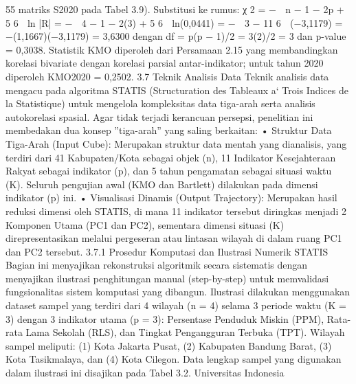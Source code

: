 55
matriks S2020 pada Tabel 3.9). Substitusi ke rumus:
χ
2 = −

n − 1 −
2p + 5
6

ln |R| = −

4 − 1 −
2(3) + 5
6

ln(0,0441)
= −

3 −
11
6

(−3,1179) = −(1,1667)(−3,1179) = 3,6300
dengan df = p(p − 1)/2 = 3(2)/2 = 3 dan p-value = 0,3038. Statistik KMO diperoleh
dari Persamaan 2.15 yang membandingkan korelasi bivariate dengan korelasi parsial
antar-indikator; untuk tahun 2020 diperoleh KMO2020 = 0,2502.
3.7 Teknik Analisis Data
Teknik analisis data mengacu pada algoritma STATIS (Structuration des Tableaux a`
Trois Indices de la Statistique) untuk mengelola kompleksitas data tiga-arah serta analisis
autokorelasi spasial. Agar tidak terjadi kerancuan persepsi, penelitian ini membedakan
dua konsep ”tiga-arah” yang saling berkaitan:
• Struktur Data Tiga-Arah (Input Cube): Merupakan struktur data mentah yang
dianalisis, yang terdiri dari 41 Kabupaten/Kota sebagai objek (n), 11 Indikator
Kesejahteraan Rakyat sebagai indikator (p), dan 5 tahun pengamatan sebagai situasi
waktu (K). Seluruh pengujian awal (KMO dan Bartlett) dilakukan pada dimensi
indikator (p) ini.
• Visualisasi Dinamis (Output Trajectory): Merupakan hasil reduksi dimensi oleh
STATIS, di mana 11 indikator tersebut diringkas menjadi 2 Komponen Utama (PC1
dan PC2), sementara dimensi situasi (K) direpresentasikan melalui pergeseran atau
lintasan wilayah di dalam ruang PC1 dan PC2 tersebut.
3.7.1 Prosedur Komputasi dan Ilustrasi Numerik STATIS
Bagian ini menyajikan rekonstruksi algoritmik secara sistematis dengan menyajikan
ilustrasi penghitungan manual (step-by-step) untuk memvalidasi fungsionalitas sistem
komputasi yang dibangun. Ilustrasi dilakukan menggunakan dataset sampel yang terdiri
dari 4 wilayah (n = 4) selama 3 periode waktu (K = 3) dengan 3 indikator utama
(p = 3): Persentase Penduduk Miskin (PPM), Rata-rata Lama Sekolah (RLS), dan Tingkat
Pengangguran Terbuka (TPT). Wilayah sampel meliputi: (1) Kota Jakarta Pusat, (2)
Kabupaten Bandung Barat, (3) Kota Tasikmalaya, dan (4) Kota Cilegon. Data lengkap
sampel yang digunakan dalam ilustrasi ini disajikan pada Tabel 3.2.
Universitas Indonesia

